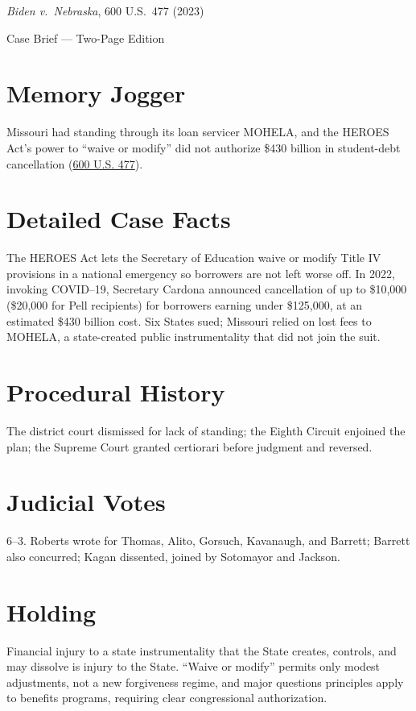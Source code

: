 \documentclass[12pt]{article}
\begin{document}
\begin{center}
{\LARGE \textit{Biden v.\ Nebraska}, 600 U.S.\ 477 (2023)\par}
\vspace{0.5em}
{\large Case Brief --- Two-Page Edition\par}
\end{center}

\section{Memory Jogger}
Missouri had standing through its loan servicer MOHELA, and the HEROES Act's power to ``waive or modify'' did not authorize \$430 billion in student-debt cancellation (\href{https://www.law.cornell.edu/supremecourt/text/22-506}{600 U.S. 477}).

\section{Detailed Case Facts}
The HEROES Act lets the Secretary of Education waive or modify Title IV provisions in a national emergency so borrowers are not left worse off. In 2022, invoking COVID--19, Secretary Cardona announced cancellation of up to \$10,000 (\$20,000 for Pell recipients) for borrowers earning under \$125,000, at an estimated \$430 billion cost. Six States sued; Missouri relied on lost fees to MOHELA, a state-created public instrumentality that did not join the suit.

\section{Procedural History}
The district court dismissed for lack of standing; the Eighth Circuit enjoined the plan; the Supreme Court granted certiorari before judgment and reversed.

\section{Judicial Votes}
6--3. Roberts wrote for Thomas, Alito, Gorsuch, Kavanaugh, and Barrett; Barrett also concurred; Kagan dissented, joined by Sotomayor and Jackson.

\section{Holding}
Financial injury to a state instrumentality that the State creates, controls, and may dissolve is injury to the State. ``Waive or modify'' permits only modest adjustments, not a new forgiveness regime, and major questions principles apply to benefits programs, requiring clear congressional authorization.
\end{document}
